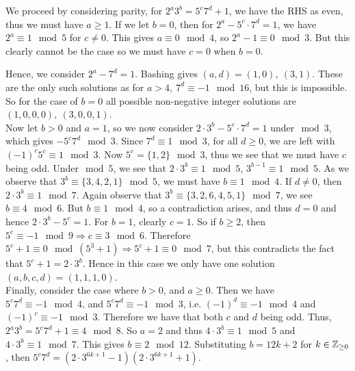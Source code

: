 \documentclass[titlepage=true]{scrartcl}
\begin{document}
     \begin{solution}\hfil\medskip 

         We proceed by considering parity, for \(2^a3^b=5^c7^d+1\), we have the RHS as even, thus we must have \(a\geq 1\). 
         If we let \(b=0\), then for \(2^a-5^c\cdot7^d=1\), we have \(2^a\equiv 1\mod{5}\) for \(c\ne0\). 
         This gives \(a\equiv0\mod{4}\), so \(2^a-1\equiv0\mod{3}\). 
         But this clearly cannot be the case so we must have \(c=0\) when \(b=0\). 

         Hence, we consider \(2^a-7^d=1\). 
         Bashing gives \((a,d)=(1,0),\ (3,1)\). 
         These are the only such solutions as for \(a>4,\ 7^d\equiv -1\mod{16}\), but this is impossible. 
         So for the case of \(b=0\) all possible non-negative integer solutions are \((1,0,0,0),\ (3,0,0,1)\).\\

         Now let \(b>0\) and \(a=1\), so we now consider \(2\cdot3^b-5^c\cdot7^d=1\) under\(\mod{3}\), which gives \(-5^c7^d\mod{3}\). 
         Since \(7^d\equiv 1\mod{3}\), for all \(d\geq0\), we are left with \((-1)^c5^c\equiv 1\mod{3}\).
         Now \(5^c=\{1,2\}\mod{3}\), thus we see that we must have \(c\) being odd. Under\(\mod{5}\), we see that \(2\cdot3^b\equiv 1\mod{5}\), \(3^{b-1}\equiv 1\mod 5\). 
         As we observe that \(3^b\equiv\{3,4,2,1\}\mod{5}\), we must have \(b\equiv 1\mod{4}\). 
         If \(d\ne0\), then \(2\cdot3^b\equiv 1\mod{7}\). Again observe that \(3^b\equiv\{3,2,6,4,5,1\}\mod{7}\), we see \(b\equiv 4\mod{6}\). 
         But \(b\equiv 1\mod{4}\), so a contradiction arises, and thus \(d=0\) and hence \(2\cdot3^b-5^c=1\). 
         For \(b=1\), clearly \(c=1\). 
         So if \(b\geq 2\), then \(5^c\equiv-1\mod{9}\Rightarrow c\equiv 3\mod{6}\). 
         Therefore \(5^c+1\equiv0\mod{(5^3+1)}\Rightarrow 5^c+1\equiv0\mod{7}\), but this contradicts the fact that \(5^c+1=2\cdot3^b\). 
         Hence in this case we only have one solution \((a,b,c,d)=(1,1,1,0)\).\\

         Finally, consider the case where \(b>0\), and \(a\geq 0\). 
         Then we have \(5^c7^d\equiv-1\mod{4}\), and \(5^c7^d\equiv-1\mod{3}\), i.e. \((-1)^d\equiv -1\mod{4}\) and \((-1)^c\equiv -1 \mod{3}\). 
         Therefore we have that both \(c\) and \(d\) being odd. Thus, \(2^a3^b=5^c7^d+1\equiv4\mod 8\). 
         So \(a=2\) and thus \(4\cdot 3^b\equiv 1\mod{5}\) and \(4\cdot3^b\equiv 1\mod{7}\). 
         This gives \(b\equiv2\mod{12}\). 
         Substituting \(b=12k+2\) for \(k\in\mathbb{Z}_{\geq0}\), then \(5^c7^d=(2\cdot3^{6k+1}-1)(2\cdot3^{6k+1}+1)\).


\end{solution}
\end{document}
